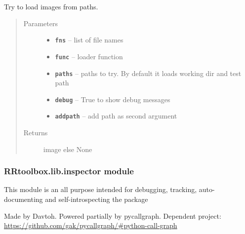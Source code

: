 \documentclass[letterpaper,10pt,english]{sphinxmanual}
\begin{document}
\begin{fulllineitems}
\label{RRtoolbox.lib:RRtoolbox.lib.image.try_loads}
Try to load images from paths.
\begin{quote}\begin{description}
\item[{Parameters}] \leavevmode\begin{itemize}
\item {} 
\textbf{\texttt{fns}} -- list of file names

\item {} 
\textbf{\texttt{func}} -- loader function

\item {} 
\textbf{\texttt{paths}} -- paths to try. By default it loads working dir and test path

\item {} 
\textbf{\texttt{debug}} -- True to show debug messages

\item {} 
\textbf{\texttt{addpath}} -- add path as second argument

\end{itemize}

\item[{Returns}] \leavevmode
image else None

\end{description}\end{quote}

\end{fulllineitems}



\subsubsection{RRtoolbox.lib.inspector module}
\label{RRtoolbox.lib:module-RRtoolbox.lib.inspector}\label{RRtoolbox.lib:rrtoolbox-lib-inspector-module}
This module is an all purpose intended for debugging, tracking, auto-documenting and self-introspecting the
package

Made by Davtoh. Powered partially by pycallgraph.
Dependent project: \href{https://github.com/gak/pycallgraph/\#python-call-graph}{https://github.com/gak/pycallgraph/\#python-call-graph}
\end{document}
